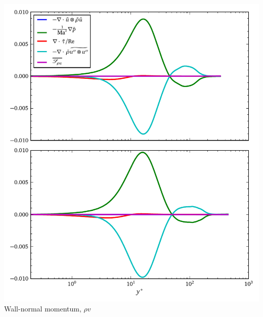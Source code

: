 \documentclass[mathserif]{beamer}
\begin{document}
\begin{frame}
\begin{columns}
\begin{column}{0.5\linewidth}
          \includegraphics[width=\textwidth]{hqd_fans_rho_v}
          \\\vspace{-0.5em}
          Wall-normal momentum, $\rho v$
        \end{column}
    \end{columns}
\end{frame}
\end{document}

